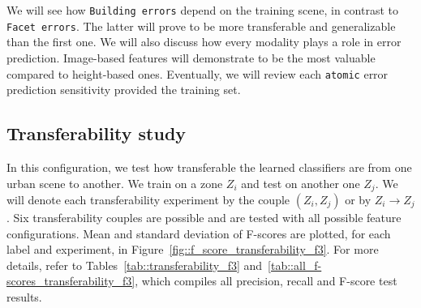     We will see how \texttt{Building errors} depend on the training scene, in contrast to \texttt{Facet errors}.
    The latter will prove to be more transferable and generalizable than the first one.
    We will also discuss how every modality plays a role in error prediction.
    Image-based features will demonstrate to be the most valuable compared to height-based ones.
    Eventually, we will review each \texttt{atomic} error prediction sensitivity provided the training set.

    \subsection{Transferability study}
        \label{subsec::more_experiments::scalability::transferability}
        In this configuration, we test how transferable the learned classifiers are from one urban scene to another.
        We train on a zone $Z_i$ and test on another one $Z_j$.
        We will denote each transferability experiment by the couple $(Z_i, Z_j)$ or by $Z_i \rightarrow Z_j$.
        Six transferability couples are possible and are tested with all possible feature configurations.
        Mean and standard deviation of F-scores are plotted, for each label and experiment, in Figure~\ref{fig::f_score_transferability_f3}.
        For more details, refer to Tables~\ref{tab::transferability_f3} and~\ref{tab::all_f-scores_transferability_f3}, which compiles all precision, recall and F-score test results.\\
        
